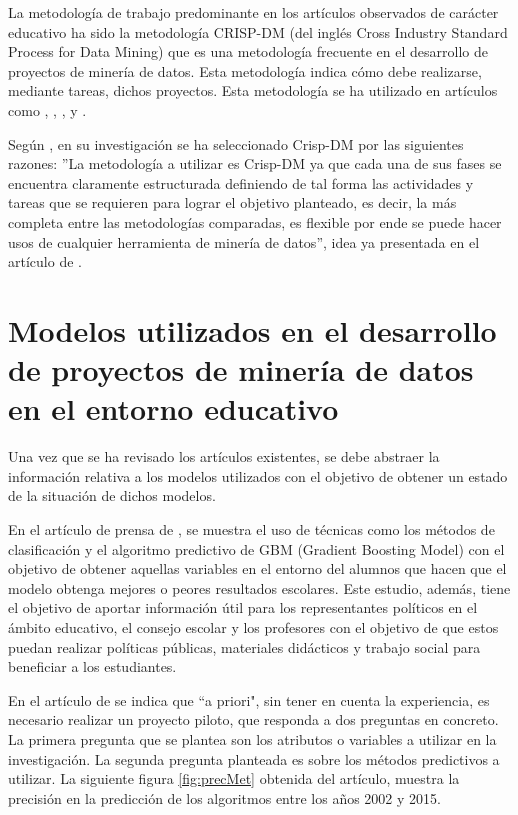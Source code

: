 La metodología de trabajo predominante en los artículos observados de carácter educativo ha sido la metodología CRISP-DM (del inglés Cross Industry Standard Process for Data Mining) que es una metodología frecuente en el desarrollo de proyectos de minería de datos. Esta metodología indica cómo debe realizarse, mediante tareas, dichos proyectos. Esta metodología se ha utilizado en artículos como , , ,  y .

Según , en su investigación se ha seleccionado Crisp-DM por las siguientes razones: ''La metodología a utilizar es Crisp-DM ya que cada una de sus fases se encuentra claramente estructurada definiendo de tal forma las actividades y tareas que se requieren para lograr el objetivo planteado, es decir, la más completa entre las metodologías comparadas, es flexible por ende se puede hacer usos de cualquier herramienta de minería de datos'', idea ya presentada en el artículo de \cite{moine2011analisis}.

\section{Modelos utilizados en el desarrollo de proyectos de minería de datos en el entorno educativo}
Una vez que se ha revisado los artículos existentes, se debe abstraer la información relativa a los modelos utilizados con el objetivo de obtener un estado de la situación de dichos modelos.

En el artículo de prensa de , se muestra el uso de técnicas como los métodos de clasificación y el algoritmo predictivo de GBM (Gradient Boosting Model) con el objetivo de obtener aquellas variables en el entorno del alumnos que hacen que el modelo obtenga mejores o peores resultados escolares. Este estudio, además, tiene el objetivo de aportar información útil para los representantes políticos en el ámbito educativo, el consejo escolar y los profesores con el objetivo de que estos puedan realizar políticas públicas, materiales didácticos y trabajo social para beneficiar a los estudiantes.

En el artículo de  se indica que ``a priori", sin tener en cuenta la experiencia, es necesario realizar un proyecto piloto, que responda a dos preguntas en concreto. La primera pregunta que se plantea son los atributos o variables a utilizar en la investigación. La segunda pregunta planteada es sobre los métodos predictivos a utilizar. La siguiente figura \ref{fig:precMet} obtenida del artículo, muestra la precisión en la predicción de los algoritmos entre los años 2002 y 2015.

